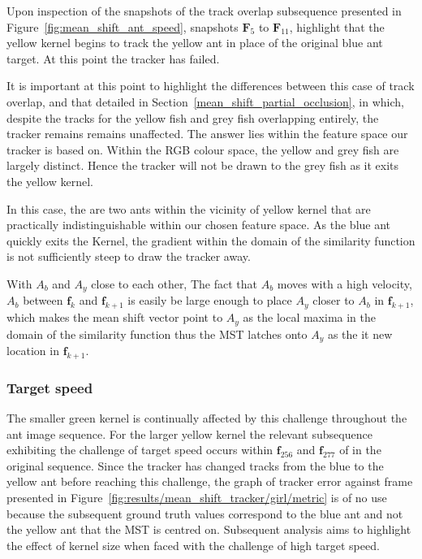 Upon inspection of the snapshots of the track overlap subsequence presented in
Figure~\ref{fig:mean_shift_ant_speed}, snapshots $\mathbf{F}_5$ to
$\mathbf{F}_{11}$, highlight that the yellow kernel begins to track the yellow
ant in place of the original blue ant target. At this point the tracker has
failed.

It is important at this point to highlight the differences between this case of
track overlap, and that detailed in Section~\ref{mean_shift_partial_occlusion},
in which, despite the tracks for the yellow fish and grey fish overlapping
entirely, the tracker remains remains unaffected.
The answer lies within the feature space our tracker is based on. Within the RGB colour space,
the yellow and grey fish are largely distinct. Hence the tracker will not be
drawn to the grey fish as it exits the yellow kernel.

In this case, the are two ants within the vicinity of yellow kernel that are practically
indistinguishable within our chosen feature space. As the blue ant quickly exits
the Kernel, the gradient within the domain of the similarity
function is not sufficiently steep to draw the tracker away.

With $A_b$ and $A_y$ close to each other, The fact that $A_b$ moves with a high
velocity, $A_b$ between $\mathbf{f}_k$ and $\mathbf{f}_{k+1}$ is easily be large
enough to place $A_y$ closer to $A_b$ in $\mathbf{f}_{k+1}$, which makes the
mean shift vector point to $A_{y}$ as the local maxima in the domain of the
similarity function thus the MST latches onto $A_y$ as the it new location in
$\mathbf{f}_{k+1}$.

\subsubsection{Target speed}\label{mean_shift_target_speed}
The smaller green kernel is continually affected by this challenge throughout
the ant image sequence.
For the larger yellow kernel the relevant subsequence exhibiting the challenge
of target speed occurs within $\mathbf{f}_{256}$ and $\mathbf{f}_{277}$ of in
the original sequence. 
Since the tracker has changed tracks from the blue to the yellow ant before
reaching this challenge, the graph of tracker error against frame presented in
Figure~\ref{fig:results/mean_shift_tracker/girl/metric} is of no use because
the subsequent ground truth values correspond to the blue ant and not the yellow
ant that the MST is centred on. Subsequent analysis aims to highlight the effect
of kernel size when faced with the challenge of high target speed.

